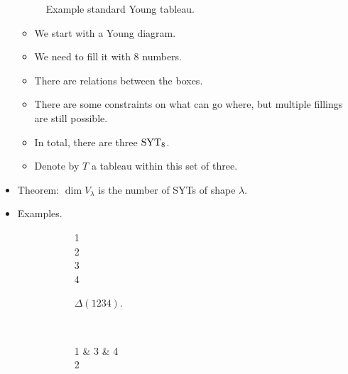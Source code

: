 \documentclass[../notes.tex]{subfiles}
\begin{document}
\begin{itemize}
\begin{figure}[H]
        \caption{Example standard Young tableau.}
        \label{fig:SYTex}
    \end{figure}
    \begin{itemize}
        \item We start with a Young diagram.
        \item We need to fill it with 8 numbers.
        \item There are relations between the boxes.
        \item There are some constraints on what can go where, but multiple fillings are still possible.
        \item In total, there are three $\operatorname{SYT}_8$.
        \item Denote by $T$ a tableau within this set of three.
    \end{itemize}
    \item Theorem: $\dim V_\lambda$ is the number of SYTs of shape $\lambda$.
    \item Examples.
    \begin{figure}[h!]
        \centering
        \begin{subfigure}[b]{0.15\linewidth}
            \centering
            \begin{ytableau}
                1\\
                2\\
                3\\
                4\\
            \end{ytableau}
            \caption{$\Delta(1234)$.}
            \label{fig:SYT4a}
        \end{subfigure}\\[1em]
        \begin{subfigure}[b]{0.15\linewidth}
            \centering
            \begin{ytableau}
                1 & 3 & 4\\
                2\\
            \end{ytableau}

\end{subfigure}
\end{figure}
\end{itemize}
\end{document}
